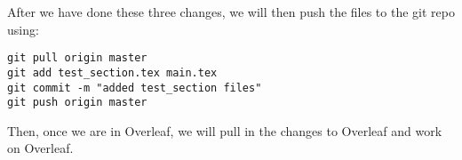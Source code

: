 After we have done these three changes, we will then push the files to
the git repo using:

\begin{verbatim}
git pull origin master
git add test_section.tex main.tex
git commit -m "added test_section files"
git push origin master
\end{verbatim}

Then, once we are in Overleaf, we will pull in the changes to Overleaf
and work on Overleaf.
